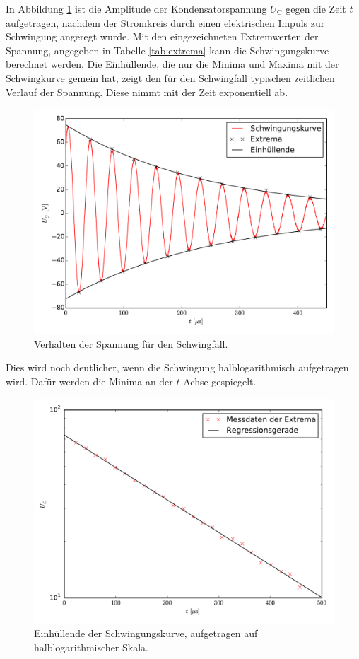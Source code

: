 In Abbildung \ref{schwingfall} ist die Amplitude der Kondensatorspannung $U_\mathup{C}$ gegen die Zeit $t$ aufgetragen, nachdem der Stromkreis durch einen elektrischen Impuls zur Schwingung angeregt wurde.
 Mit den eingezeichneten Extremwerten der Spannung, angegeben in Tabelle \ref{tab:extrema} kann die Schwingungskurve berechnet werden.
 Die Einhüllende, die nur die Minima und Maxima mit der Schwingkurve gemein hat, zeigt den für den Schwingfall typischen zeitlichen Verlauf der Spannung. 
Diese nimmt mit der Zeit exponentiell ab.
\begin{figure}[h]
		\centering
		\includegraphics[width=\textwidth]{build/plot_schwingungskurve.pdf}
		\caption{Verhalten der Spannung für den Schwingfall.}
\label{schwingfall}
\end{figure}
Dies wird noch deutlicher, wenn die Schwingung halblogarithmisch aufgetragen wird. Dafür werden die Minima an der $t$-Achse gespiegelt.
\begin{figure}[h]
		\centering
		\includegraphics[width=\textwidth]{build/plot_einhuellende_semilog.pdf}
		\caption{Einhüllende der Schwingungskurve, aufgetragen auf halblogarithmischer Skala.}
\end{figure}
